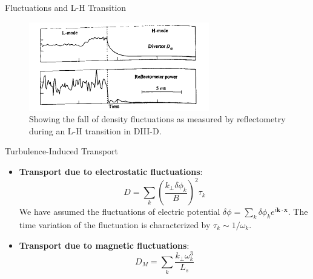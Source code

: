 \begin{frame} {Fluctuations and L-H Transition}
    \begin{figure}
        \centering
        \includegraphics[width=0.7\textwidth]{figures/fluctuations-and-modes.png}
        \caption{Showing the fall of density fluctuations as measured by reflectometry during an L-H transition in DIII-D.}
        \label{fig:fluctuation-and-modes}
    \end{figure}
\end{frame}

\begin{frame} {Turbulence-Induced Transport}
    \begin{itemize}
        \item \textbf{Transport due to electrostatic fluctuations}:
              \[ D = \sum_k \left( \frac{k_\perp\delta\phi_k}{B} \right)^2 \tau_k \]
              We have assumed the fluctuations of electric potential $\delta\phi = \sum_k\delta\phi_ke^{i\mathbf{k\cdot x}}$. The time variation of the fluctuation is characterized by $\tau_k \sim 1/\omega_k$.
        \item \textbf{Transport due to magnetic fluctuations}:
              \[ D_M = \sum_k \frac{k_\perp\omega_k^3}{L_s} \]
    \end{itemize}
\end{frame}